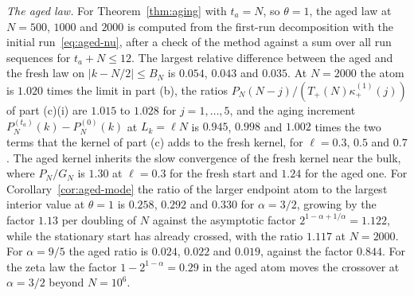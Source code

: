 \emph{The aged law.} For Theorem~\ref{thm:aging} with $t_a=N$, so $\theta=1$, the aged law
at $N=500$, $1000$ and $2000$ is computed from the first-run decomposition with the
initial run~\eqref{eq:aged-nu}, after a check of the method against a sum over all run
sequences for $t_a+N\le12$. The largest relative difference between the aged and the
fresh law on $|k-N/2|\le B_N$ is $0.054$, $0.043$ and $0.035$. At $N=2000$ the atom is
$1.020$ times the limit in part (b), the ratios $P_N(N-j)/(T_\plus(N)\kappa^{(1)}_\plus(j))$
of part (c)(i) are $1.015$ to $1.028$ for $j=1,\dots,5$, and the aging increment
$P^{(t_a)}_N(k)-P^{(0)}_N(k)$ at $L_k=\ell N$ is $0.945$, $0.998$ and $1.002$ times the two
terms that the kernel of part (c) adds to the fresh kernel, for $\ell=0.3$, $0.5$ and
$0.7$. The aged kernel inherits the slow convergence of the fresh kernel near the bulk,
where $P_N/G_N$ is $1.30$ at $\ell=0.3$ for the fresh start and $1.24$ for the aged one.
For Corollary~\ref{cor:aged-mode} the ratio of the larger endpoint atom to the largest
interior value at $\theta=1$ is $0.258$, $0.292$ and $0.330$ for $\alpha=3/2$, growing by
the factor $1.13$ per doubling of $N$ against the asymptotic factor
$2^{1-\alpha+1/\alpha}=1.122$, while the stationary start has already crossed, with the
ratio $1.117$ at $N=2000$. For $\alpha=9/5$ the aged ratio is $0.024$, $0.022$ and $0.019$,
against the factor $0.844$. For the zeta law the factor $1-2^{1-\alpha}=0.29$ in the aged
atom moves the crossover at $\alpha=3/2$ beyond $N=10^6$.

